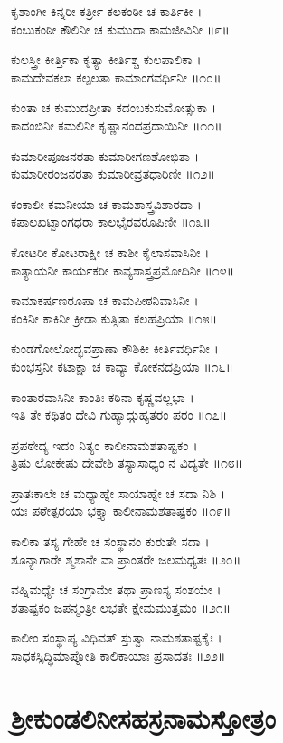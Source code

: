 ಕೃಶಾಂಗೀ ಕಿನ್ನರೀ ಕರ್ತ್ರೀ ಕಲಕಂಠೀ ಚ ಕಾರ್ತಿಕೀ ।\\
ಕಂಬುಕಂಠೀ ಕೌಲಿನೀ ಚ ಕುಮುದಾ ಕಾಮಜೀವಿನೀ ॥೯॥

ಕುಲಸ್ತ್ರೀ ಕೀರ್ತ್ತಿಕಾ ಕೃತ್ಯಾ ಕೀರ್ತಿಶ್ಚ ಕುಲಪಾಲಿಕಾ ।\\
ಕಾಮದೇವಕಲಾ ಕಲ್ಪಲತಾ ಕಾಮಾಂಗವರ್ಧಿನೀ ॥೧೦॥

ಕುಂತಾ ಚ ಕುಮುದಪ್ರೀತಾ ಕದಂಬಕುಸುಮೋತ್ಸುಕಾ ।\\
ಕಾದಂಬಿನೀ ಕಮಲಿನೀ ಕೃಷ್ಣಾನಂದಪ್ರದಾಯಿನೀ ॥೧೧॥

ಕುಮಾರೀಪೂಜನರತಾ ಕುಮಾರೀಗಣಶೋಭಿತಾ ।\\
ಕುಮಾರೀರಂಜನರತಾ ಕುಮಾರೀವ್ರತಧಾರಿಣೀ ॥೧೨॥

ಕಂಕಾಲೀ ಕಮನೀಯಾ ಚ ಕಾಮಶಾಸ್ತ್ರವಿಶಾರದಾ ।\\
ಕಪಾಲಖಟ್ವಾಂಗಧರಾ ಕಾಲಭೈರವರೂಪಿಣೀ ॥೧೩॥

ಕೋಟರೀ ಕೋಟರಾಕ್ಷೀ ಚ ಕಾಶೀ ಕೈಲಾಸವಾಸಿನೀ ।\\
ಕಾತ್ಯಾಯನೀ ಕಾರ್ಯಕರೀ ಕಾವ್ಯಶಾಸ್ತ್ರಪ್ರಮೋದಿನೀ ॥೧೪॥

ಕಾಮಾಕರ್ಷಣರೂಪಾ ಚ ಕಾಮಪೀಠನಿವಾಸಿನೀ ।\\
ಕಂಕಿನೀ ಕಾಕಿನೀ ಕ್ರೀಡಾ ಕುತ್ಸಿತಾ ಕಲಹಪ್ರಿಯಾ ॥೧೫॥

ಕುಂಡಗೋಲೋದ್ಭವಪ್ರಾಣಾ ಕೌಶಿಕೀ ಕೀರ್ತಿವರ್ಧಿನೀ ।\\
ಕುಂಭಸ್ತನೀ ಕಟಾಕ್ಷಾ ಚ ಕಾವ್ಯಾ ಕೋಕನದಪ್ರಿಯಾ ॥೧೬॥

ಕಾಂತಾರವಾಸಿನೀ ಕಾಂತಿಃ ಕಠಿನಾ ಕೃಷ್ಣವಲ್ಲಭಾ ।\\
ಇತಿ ತೇ ಕಥಿತಂ ದೇವಿ ಗುಹ್ಯಾದ್ಗುಹ್ಯತರಂ ಪರಂ ॥೧೭॥

ಪ್ರಪಠೇದ್ಯ ಇದಂ ನಿತ್ಯಂ ಕಾಲೀನಾಮಶತಾಷ್ಟಕಂ ।\\
ತ್ರಿಷು ಲೋಕೇಷು ದೇವೇಶಿ ತಸ್ಯಾಸಾಧ್ಯಂ ನ ವಿದ್ಯತೇ ॥೧೮॥

ಪ್ರಾತಃಕಾಲೇ ಚ ಮಧ್ಯಾಹ್ನೇ ಸಾಯಾಹ್ನೇ ಚ ಸದಾ ನಿಶಿ ।\\
ಯಃ ಪಠೇತ್ಪರಯಾ ಭಕ್ತ್ಯಾ ಕಾಲೀನಾಮಶತಾಷ್ಟಕಂ ॥೧೯॥

ಕಾಲಿಕಾ ತಸ್ಯ ಗೇಹೇ ಚ ಸಂಸ್ಥಾನಂ ಕುರುತೇ ಸದಾ ।\\
ಶೂನ್ಯಾಗಾರೇ ಶ್ಮಶಾನೇ ವಾ ಪ್ರಾಂತರೇ ಜಲಮಧ್ಯತಃ ॥೨೦॥

ವಹ್ನಿಮಧ್ಯೇ ಚ ಸಂಗ್ರಾಮೇ ತಥಾ ಪ್ರಾಣಸ್ಯ ಸಂಶಯೇ ।\\
ಶತಾಷ್ಟಕಂ ಜಪನ್ಮಂತ್ರೀ ಲಭತೇ ಕ್ಷೇಮಮುತ್ತಮಂ ॥೨೧॥

ಕಾಲೀಂ ಸಂಸ್ಥಾಪ್ಯ ವಿಧಿವತ್ ಸ್ತುತ್ವಾ ನಾಮಶತಾಷ್ಟಕೈಃ ।\\
ಸಾಧಕಸ್ಸಿದ್ಧಿಮಾಪ್ನೋತಿ ಕಾಲಿಕಾಯಾಃ ಪ್ರಸಾದತಃ ॥೨೨॥


\section{ಶ್ರೀಕುಂಡಲಿನೀಸಹಸ್ರನಾಮಸ್ತೋತ್ರಂ}

